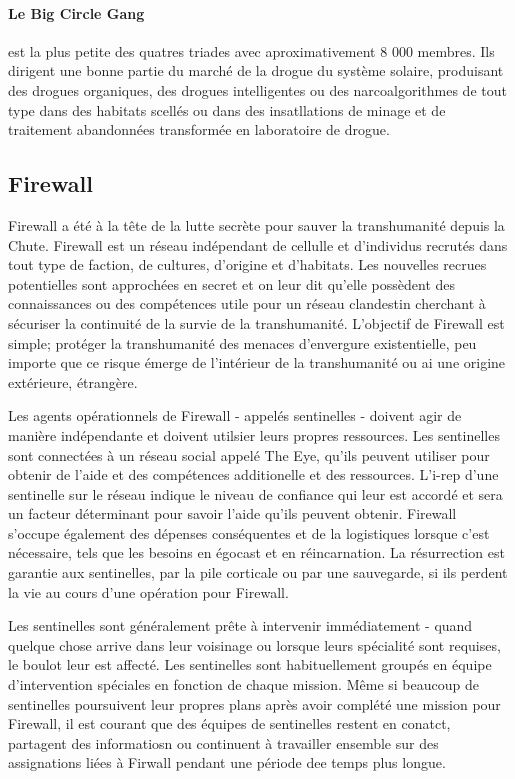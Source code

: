 \paragraph{Le Big Circle Gang} \label{sec:big-circle-gang} est la plus petite des quatres triades avec aproximativement 8 000 membres. Ils dirigent une bonne partie du marché de la drogue du système solaire, produisant des drogues organiques, des drogues intelligentes ou des narcoalgorithmes de tout type dans des habitats scellés ou dans des insatllations de minage et de traitement abandonnées transformée en laboratoire de drogue. 

\subsection{Firewall} \label{sec:firewall} 

Firewall a été à la tête de la lutte secrète pour sauver la transhumanité depuis la Chute. Firewall est un réseau indépendant de cellulle et d'individus recrutés dans tout type de faction, de cultures, d'origine et d'habitats. Les nouvelles recrues potentielles sont approchées en secret et on leur dit qu'elle possèdent des connaissances ou des compétences utile pour un réseau clandestin cherchant à sécuriser la continuité de la survie de la transhumanité. L'objectif de Firewall est simple; protéger la transhumanité des menaces d'envergure existentielle, peu importe que ce risque émerge de l'intérieur de la transhumanité ou ai une origine extérieure, étrangère. 

Les agents opérationnels de Firewall - appelés sentinelles - doivent agir de manière indépendante et doivent utilsier leurs propres ressources. Les sentinelles sont connectées à un réseau social appelé The Eye, qu'ils peuvent utiliser pour obtenir de l'aide et des compétences additionelle et des ressources. L'i-rep d'une sentinelle sur le réseau indique le niveau de confiance qui leur est accordé et sera un facteur déterminant pour savoir l'aide qu'ils peuvent obtenir. Firewall s'occupe également des dépenses conséquentes et de la logistiques lorsque c'est nécessaire, tels que les besoins en égocast et en réincarnation. La résurrection est garantie aux sentinelles, par la pile corticale ou par une sauvegarde, si ils perdent la vie au cours d'une opération pour Firewall. 

Les sentinelles sont généralement prête à intervenir immédiatement - quand quelque chose arrive dans leur voisinage ou lorsque leurs spécialité sont requises, le boulot leur est affecté. Les sentinelles sont habituellement groupés en équipe d'intervention spéciales en fonction de chaque mission. Même si beaucoup de sentinelles poursuivent leur propres plans après avoir complété une mission pour Firewall, il est courant que des équipes de sentinelles restent en conatct, partagent des informatiosn ou continuent à travailler ensemble sur des assignations liées à Firwall pendant une période dee temps plus longue. 


